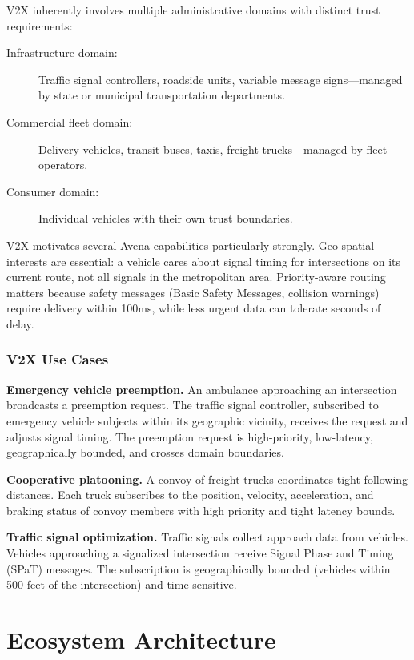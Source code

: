 V2X inherently involves multiple administrative domains with distinct trust requirements:

\begin{description}
    \item[Infrastructure domain:] Traffic signal controllers, roadside units, variable message signs---managed by state or municipal transportation departments.
    \item[Commercial fleet domain:] Delivery vehicles, transit buses, taxis, freight trucks---managed by fleet operators.
    \item[Consumer domain:] Individual vehicles with their own trust boundaries.
\end{description}

V2X motivates several Avena capabilities particularly strongly. Geo-spatial interests are essential: a vehicle cares about signal timing for intersections on its current route, not all signals in the metropolitan area. Priority-aware routing matters because safety messages (Basic Safety Messages, collision warnings) require delivery within 100ms, while less urgent data can tolerate seconds of delay.

\subsubsection{V2X Use Cases}

\textbf{Emergency vehicle preemption.} An ambulance approaching an intersection broadcasts a preemption request. The traffic signal controller, subscribed to emergency vehicle subjects within its geographic vicinity, receives the request and adjusts signal timing. The preemption request is high-priority, low-latency, geographically bounded, and crosses domain boundaries.

\textbf{Cooperative platooning.} A convoy of freight trucks coordinates tight following distances. Each truck subscribes to the position, velocity, acceleration, and braking status of convoy members with high priority and tight latency bounds.

\textbf{Traffic signal optimization.} Traffic signals collect approach data from vehicles. Vehicles approaching a signalized intersection receive Signal Phase and Timing (SPaT) messages. The subscription is geographically bounded (vehicles within 500 feet of the intersection) and time-sensitive.

\section{Ecosystem Architecture}


